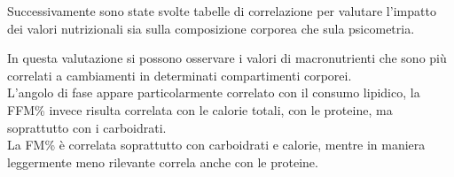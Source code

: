 \documentclass[12pt]{article}
\begin{document}
Successivamente sono state svolte tabelle di correlazione per valutare l'impatto dei valori nutrizionali sia sulla composizione corporea che sula psicometria.


\begin{table}[H]
    \centering
    \caption{Correlazioni tra valori nutrizionali e BIA nei pazienti AFAB}
    \vspace*{0.2em}
{\renewcommand{\arraystretch}{2}%
}
    \label{tab:my_label}
\end{table}

In questa valutazione si possono osservare i valori di macronutrienti che sono più correlati a cambiamenti in determinati compartimenti corporei.\\
L'angolo di fase appare particolarmente correlato con il consumo lipidico, la FFM\% invece risulta correlata con le calorie totali, con le proteine, ma soprattutto con i carboidrati.\\
La FM\% è correlata soprattutto con carboidrati e calorie, mentre in maniera leggermente meno rilevante correla anche con le proteine.
\end{document}
